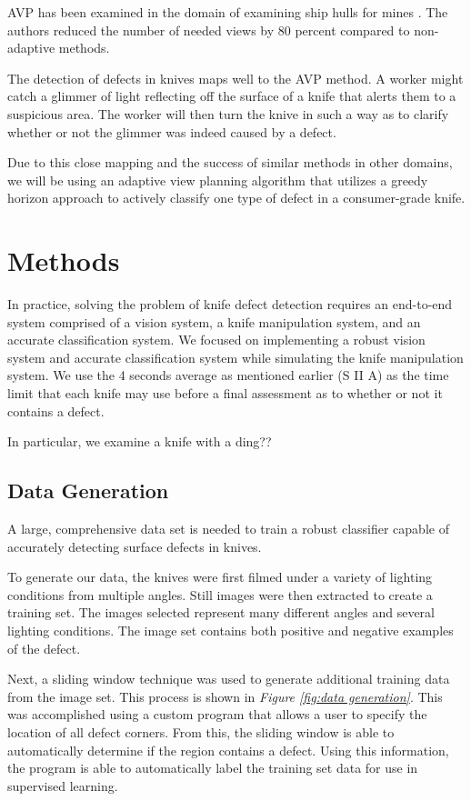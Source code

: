 \documentclass[letterpaper, 10 pt, conference]{ieeeconf}  %
\begin{document}
AVP has been examined in the domain of examining ship hulls for mines \cite{hollinger2011active}. The authors reduced the number of needed views by 80 percent compared to non-adaptive methods.

The detection of defects in knives maps well to the AVP method. A worker might catch a glimmer of light reflecting off the surface of a knife that alerts them to a suspicious area. The worker will then turn the knive in such a way as to clarify whether or not the glimmer was indeed caused by a defect. 

Due to this close mapping and the success of similar methods in other domains, we will be using an adaptive view planning algorithm that utilizes a greedy horizon approach to actively classify one type of defect in a consumer-grade knife.

\section{Methods}

In practice, solving the problem of knife defect detection requires an end-to-end system comprised of a vision system, a knife manipulation system, and an accurate classification system. We focused on implementing a robust vision system and accurate classification system while simulating the knife manipulation system. We use the 4 seconds average as mentioned earlier (S II A) as the time limit that each knife may use before a final assessment as to whether or not it contains a defect.

In particular, we examine a knife with a ding??

\subsection{Data Generation}


A large, comprehensive data set is needed to train a robust classifier capable of accurately detecting surface defects in knives.

To generate our data, the knives were first filmed under a variety of lighting conditions from multiple angles. Still images were then extracted to create a training set. The images selected represent many different angles and several lighting conditions. The image set contains both positive and negative examples of the defect.

Next, a sliding window technique was used to generate additional training data from the image set. This process is shown in \textit{Figure \ref{fig:data generation}}. This was accomplished using a custom program that allows a user to specify the location of all defect corners. From this, the sliding window is able to automatically determine if the region contains a defect. Using this information, the program is able to automatically label the training set data for use in supervised learning.
\end{document}
